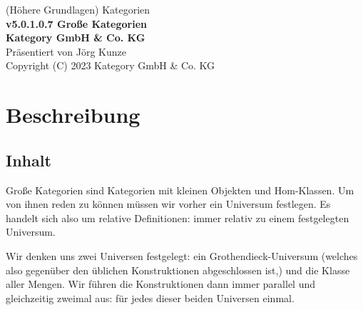 \documentclass[a4paper]{amsart}
\theoremstyle{definition}
\begin{document}
\begin{titlepage}
\centering
{\huge
(Höhere Grundlagen) Kategorien\\[1cm]
\textbf{v5.0.1.0.7 Große Kategorien}
}\\[1cm]

\textbf{Kategory GmbH \& Co. KG}\\
Präsentiert von Jörg Kunze\\
Copyright (C) 2023 Kategory GmbH \& Co. KG

\end{titlepage}

%

\newpage

\section*{Beschreibung}

\subsection*{Inhalt}
Große Kategorien sind Kategorien mit kleinen Objekten und Hom-Klassen. Um von ihnen reden zu können müssen wir vorher ein Universum festlegen. Es handelt sich also um relative Definitionen: immer relativ zu einem festgelegten Universum.

Wir denken uns zwei Universen festgelegt: ein Grothendieck-Universum (welches also gegenüber den üblichen Konstruktionen abgeschlossen ist,) und die Klasse aller Mengen. Wir führen die Konstruktionen dann immer parallel und gleichzeitig zweimal aus: für jedes dieser beiden Universen einmal.
\end{document}
